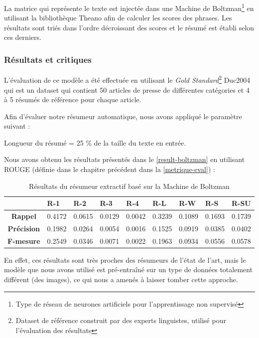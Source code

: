     La matrice qui représente le texte est injectée dans une Machine de Boltzman\footnote{Type de réseau de neurones artificiels pour l'apprentissage non supervisé} en utilisant la bibliothèque Theano \cite{theano} afin de calculer les scores des phrases. Les résultats sont triés dans l'ordre décroissant des scores et le résumé est établi selon ces derniers.
    
    \subsubsection{Résultats et critiques}
    L'évaluation de ce modèle a été effectuée en utilisant le \emph{Gold Standard}\footnote{Dataset de référence construit par des experts linguistes, utilisé pour l'évaluation des résultats} Duc2004 qui est un dataset qui contient 50 articles de presse de différentes catégories et 4 à 5 résumés de référence pour chaque article.
    
    Afin d'évaluer notre résumeur automatique, nous avons appliqué le paramètre suivant :
    
    Longueur du résumé = 25 \% de la taille du texte en entrée.
    
    Nous avons obtenu les résultats présentés dans le \autoref{result-boltzman} en utilisant ROUGE (définie dans le chapitre précédent dans la \autoref{metrique-eval}) : 
    \begin{table}[H]
        \begin{center}
            \begin{tabular}{|c|C{1.2cm}|C{1.2cm}|C{1.2cm}|C{1.2cm}|C{1.2cm}|C{1.2cm}|C{1.2cm}|C{1.2cm}|}
                 & \textbf{R-1} &  \textbf{R-2} &  \textbf{R-3} &  \textbf{R-4} &  \textbf{R-L} &  \textbf{R-W} &  \textbf{R-S} &  \textbf{R-SU} \\
                \hline
                \textbf{Rappel} & 0.4172 & 0.0615 & 0.0129 & 0.0042 & 0.3239 & 0.1089 & 0.1693 & 0.1739 \\
                \textbf{Précision} & 0.1982 & 0.0264 & 0.0054 & 0.0016 & 0.1525 & 0.0919 & 0.0385 & 0.0402 \\
                \textbf{F-mesure} & 0.2549 & 0.0346 & 0.0071 & 0.0022 & 0.1963 & 0.0934 & 0.0556 & 0.0578 \\
                \hline
            \end{tabular}
        \end{center}
        \caption{Résultats du résumeur extractif basé sur la Machine de Boltzman}
        \label{result-boltzman}
    \end{table}
    En effet, ces résultats sont très proches des résumeurs de l'état de l'art, mais le modèle que nous avons utilisé est pré-entraîné sur un type de données totalement différent (des images), ce qui nous a amenés à laisser tomber cette approche.   

